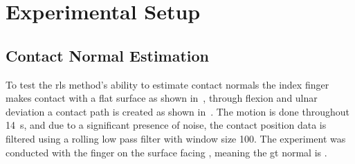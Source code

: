 \section{Experimental Setup}\label{sec:1-tactile-perception-experimental-setup}


\subsection{Contact Normal Estimation}\label{sec:1-tactile-perception-experimental-setup-contact-normal-estimation}

To test the \gls{rls} method's ability to estimate contact normals the index finger makes contact with a flat surface as shown in~, through flexion and ulnar deviation a contact path is created as shown in~. The motion is done throughout \SI{14}{\second}, and due to a significant presence of noise, the contact position data is filtered using a rolling low pass filter with window size \num{100}. The experiment was conducted with the finger on the surface facing , meaning the \gls{gt} normal is .

